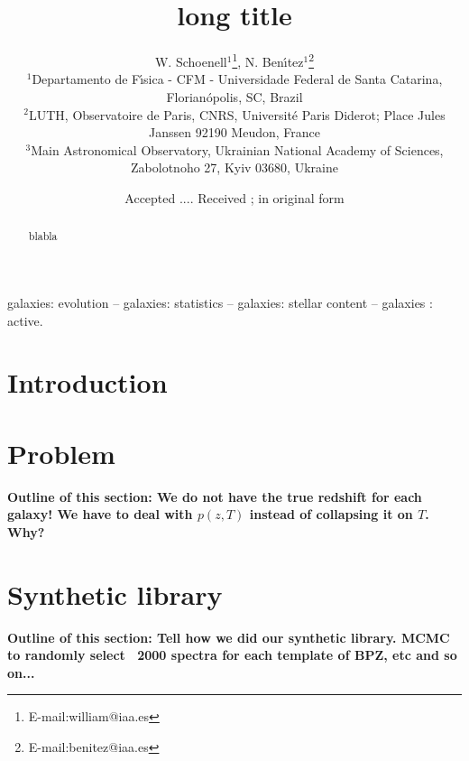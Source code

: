 \documentclass[a4paper, useAMS, usenatbib, hyperpdf]{mn2e}
\title[H~{\sc ii} short title]
{long title}
\author[Schoenell et al.] {
	  W. Schoenell$^{1}$\thanks{E-mail:william@iaa.es}, 
      N. Ben\'\i tez$^{1}$\thanks{E-mail:benitez@iaa.es}\\
          $^{1}$Departamento de F\'{\i}sica - CFM - Universidade Federal de Santa Catarina, Florian\'opolis, SC, Brazil\\
          $^{2}$LUTH, Observatoire de Paris, CNRS, Universit\'e Paris Diderot; Place Jules Janssen 92190 Meudon, France\\
          $^{3}$Main Astronomical Observatory, Ukrainian National Academy of Sciences, Zabolotnoho 27, Kyiv 03680,  Ukraine\\
	}
\begin{document}
\date{Accepted .... Received ; in original form }

\pagerange{\pageref{firstpage}--\pageref{lastpage}} 

\maketitle

\label{firstpage}

\begin{abstract} 

blabla






\end{abstract}

\begin{keywords}
galaxies:  evolution -- galaxies: statistics -- galaxies: stellar content -- galaxies : active.
\end{keywords}


\section{Introduction}

\section{Problem}
{\bf \color{red} Outline of this section: We do not have the true redshift for each galaxy! We have to deal with $p(z,T)$ instead of collapsing it on $T$. Why?}




\section{Synthetic library}
{\bf \color{red} Outline of this section: Tell how we did our synthetic library. MCMC to randomly select ~2000 spectra for each template of BPZ, etc and so on...}
\end{document}
